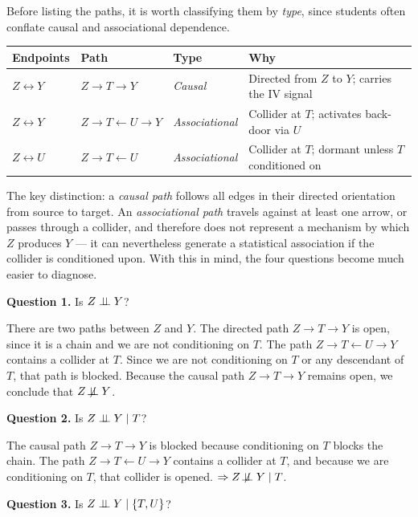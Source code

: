 \documentclass[master.tex]{subfiles}
\begin{document}
Before listing the paths, it is worth classifying them by \emph{type},
since students often conflate causal and associational dependence.

\begin{center}
\renewcommand{\arraystretch}{1.35}
\begin{tabular}{@{}llll@{}}
\toprule
\textbf{Endpoints} & \textbf{Path} & \textbf{Type} & \textbf{Why} \\
\midrule
$Z \leftrightarrow Y$ & $Z \to T \to Y$ & \emph{Causal} & Directed from $Z$ to $Y$; carries the IV signal \\
$Z \leftrightarrow Y$ & $Z \to T \leftarrow U \to Y$ & \emph{Associational} & Collider at $T$; activates back-door via $U$ \\
$Z \leftrightarrow U$ & $Z \to T \leftarrow U$ & \emph{Associational} & Collider at $T$; dormant unless $T$ conditioned on \\
\bottomrule
\end{tabular}
\end{center}

\medskip
\noindent The key distinction: a \emph{causal path} follows all edges in
their directed orientation from source to target.
An \emph{associational path} travels against at least one arrow, or passes
through a collider, and therefore does not represent a mechanism by which
$Z$ produces $Y$ --- it can nevertheless generate a statistical association
if the collider is conditioned upon.
With this in mind, the four questions become much easier to diagnose.

\medskip
\noindent\textbf{Question 1.} Is $Z \perp\!\!\!\perp Y$?

\noindent There are two paths between $Z$ and $Y$.
The directed path $Z \to T \to Y$ is open, since it is a chain and we
are not conditioning on $T$.
The path $Z \to T \leftarrow U \to Y$ contains a collider at $T$.
Since we are not conditioning on $T$ or any descendant of $T$, that path
is blocked.
Because the causal path $Z \to T \to Y$ remains open, we conclude that
$Z \not\!\perp\!\!\!\perp Y$.

\medskip
\noindent\textbf{Question 2.} Is $Z \perp\!\!\!\perp Y \mid T$?

\noindent The causal path $Z \to T \to Y$ is blocked because conditioning
on $T$ blocks the chain.
The path $Z \to T \leftarrow U \to Y$ contains a collider at $T$, and
because we are conditioning on $T$, that collider is opened.
$\Rightarrow Z \not\!\perp\!\!\!\perp Y \mid T$.

\medskip
\noindent\textbf{Question 3.} Is $Z \perp\!\!\!\perp Y \mid \{T, U\}$?
\end{document}
